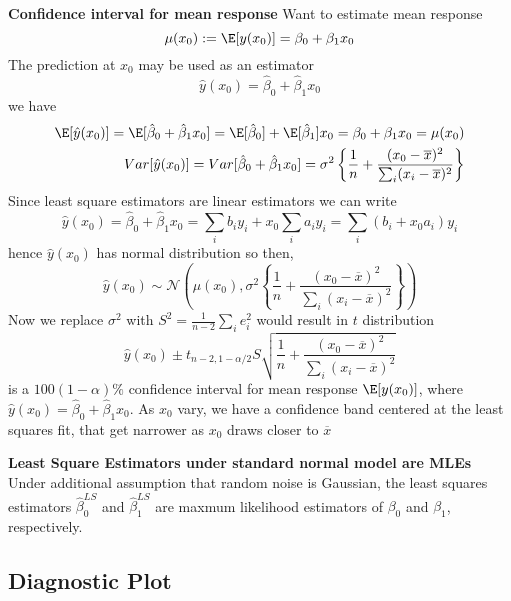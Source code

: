 \documentclass[11pt]{article}
\begin{document}
\begin{defn*}
  \textbf{Confidence interval for mean response} Want to estimate mean response
  \[
    \mu(x_0) := \E[y(x_0)] = \beta_0 + \beta_1 x_0
  \]
  The prediction at $x_0$ may be used as an estimator
  \[
    \hat{y}(x_0) = \hat{\beta}_0 + \hat{\beta}_1 x_0
  \]
  we have
  \begin{align*}
    \E[\hat{y}(x_0)] = \E[\hat{\beta}_0 + \hat{\beta}_1 x_0] = \E[\hat{\beta}_0] + \E[\hat{\beta}_1] x_0 = \beta_0 + \beta_1 x_0  = \mu(x_0)\\
    Var[\hat{y}(x_0)] = Var[\hat{\beta}_0 + \hat{\beta}_1 x_0] = \sigma^2 \left\{ \frac{1}{n} + \frac{(x_0 - \overline{x})^2}{\sum_i (x_i - \overline{x})^2}  \right\}
  \end{align*}
  Since least square estimators are linear estimators we can write
  \[
    \hat{y}(x_0) = \hat{\beta}_0 + \hat{\beta}_1 x_0 = \sum_i b_i y_i + x_0 \sum_i a_i y_i = \sum_i (b_i + x_0 a_i)y_i
  \]
  hence $\hat{y}(x_0)$ has normal distribution so then,
  \[
    \hat{y}(x_0) \sim \mathcal{N} \left( \mu(x_0), \sigma^2 \left\{ \frac{1}{n} + \frac{(x_0 - \overline{x})^2}{\sum_i (x_i - \overline{x})^2}  \right\}  \right)
  \]
  Now we replace $\sigma^2$ with $S^2 = \frac{1}{n-2}\sum_i e_i^2$ would result in $t$ distribution
  \[
    \hat{y}(x_0) \pm t_{n-2, 1-\alpha/2} S \sqrt{ \frac{1}{n} + \frac{(x_0 - \overline{x})^2}{\sum_i (x_i - \overline{x})^2} }
  \]
  is a $100(1-\alpha)\%$ confidence interval for mean response $\E[y(x_0)]$, where $\hat{y}(x_0) = \hat{\beta}_0 + \hat{\beta}_1 x_0$. As $x_0$ vary, we have a confidence band centered at the least squares fit, that get narrower as $x_0$ draws closer to $\overline{x}$
\end{defn*}

\begin{defn*}
  \textbf{Least Square Estimators under standard normal model are MLEs} Under additional assumption that random noise is Gaussian, the least squares estimators $\hat{\beta}_0^{LS}$ and $\hat{\beta}_1^{LS}$ are maxmum likelihood estimators of $\beta_0$ and $\beta_1$, respectively.
\end{defn*}

\subsection*{Diagnostic Plot}
\end{document}
